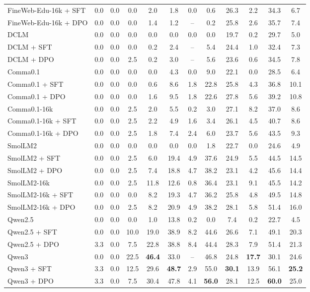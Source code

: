 \begin{table}[ht]
\begin{tabular}{lccccccccccc}
FineWeb-Edu-16k + SFT & 0.0 & 0.0 & 0.0 & 2.0 & 1.8 & 0.0 & 0.6 & 26.3 & 2.2 & 34.3 & 6.7 \\
FineWeb-Edu-16k + DPO & 0.0 & 0.0 & 0.0 & 1.4 & 1.2 & -- & 0.2 & 25.8 & 2.6 & 35.7 & 7.4 \\
\midrule
\addlinespace[0.3em]
DCLM & 0.0 & 0.0 & 0.0 & 0.0 & 0.0 & 0.0 & 0.0 & 19.7 & 0.2 & 29.7 & 5.0 \\
DCLM + SFT & 0.0 & 0.0 & 0.0 & 0.2 & 2.4 & -- & 5.4 & 24.4 & 1.0 & 32.4 & 7.3 \\
DCLM + DPO & 0.0 & 0.0 & 2.5 & 0.2 & 3.0 & -- & 5.6 & 23.6 & 0.6 & 34.5 & 7.8 \\
\midrule
\addlinespace[0.3em]
Comma0.1 & 0.0 & 0.0 & 0.0 & 0.0 & 4.3 & 0.0 & 9.0 & 22.1 & 0.0 & 28.5 & 6.4 \\
Comma0.1 + SFT & 0.0 & 0.0 & 0.0 & 0.6 & 8.6 & 1.8 & 22.8 & 25.8 & 4.3 & 36.8 & 10.1 \\
Comma0.1 + DPO & 0.0 & 0.0 & 0.0 & 1.6 & 9.5 & 1.8 & 22.6 & 27.8 & 5.6 & 39.2 & 10.8 \\
\midrule
\addlinespace[0.3em]
Comma0.1-16k & 0.0 & 0.0 & 2.5 & 2.0 & 5.5 & 0.2 & 3.0 & 27.1 & 8.2 & 37.0 & 8.6 \\
Comma0.1-16k + SFT & 0.0 & 0.0 & 2.5 & 2.2 & 4.9 & 1.6 & 3.4 & 26.1 & 4.5 & 40.7 & 8.6 \\
Comma0.1-16k + DPO & 0.0 & 0.0 & 2.5 & 1.8 & 7.4 & 2.4 & 6.0 & 23.7 & 5.6 & 43.5 & 9.3 \\
\midrule
\addlinespace[0.3em]
SmolLM2 & 0.0 & 0.0 & 0.0 & 0.0 & 0.0 & 0.0 & 1.8 & 22.7 & 0.0 & 24.6 & 4.9 \\
SmolLM2 + SFT & 0.0 & 0.0 & 2.5 & 6.0 & 19.4 & 4.9 & 37.6 & 24.9 & 5.5 & 44.5 & 14.5 \\
SmolLM2 + DPO & 0.0 & 0.0 & 2.5 & 7.4 & 18.8 & 4.7 & 38.2 & 23.1 & 4.2 & 45.6 & 14.4 \\
\midrule
\addlinespace[0.3em]
SmolLM2-16k & 0.0 & 0.0 & 2.5 & 11.8 & 12.6 & 0.8 & 36.4 & 23.1 & 9.1 & 45.5 & 14.2 \\
SmolLM2-16k + SFT & 0.0 & 0.0 & 0.0 & 8.2 & 19.3 & 4.7 & 36.2 & 25.8 & 4.8 & 49.5 & 14.8 \\
SmolLM2-16k + DPO & 0.0 & 0.0 & 2.5 & 8.2 & 20.9 & 4.9 & 38.2 & 28.1 & 5.8 & 51.4 & 16.0 \\
\midrule
\addlinespace[0.3em]
Qwen2.5 & 0.0 & 0.0 & 0.0 & 1.0 & 13.8 & 0.2 & 0.0 & 7.4 & 0.2 & 22.7 & 4.5 \\
Qwen2.5 + SFT & 0.0 & 0.0 & 10.0 & 19.0 & 38.9 & 8.2 & 44.6 & 26.6 & 7.1 & 49.1 & 20.3 \\
Qwen2.5 + DPO & 3.3 & 0.0 & 7.5 & 22.8 & 38.8 & 8.4 & 44.4 & 28.3 & 7.9 & 51.4 & 21.3 \\
\midrule
\addlinespace[0.3em]
Qwen3 & 0.0 & 0.0 & 22.5 & \textbf{46.4} & 33.0 & -- & 46.8 & 24.8 & \textbf{17.7} & 30.1 & 24.6 \\
Qwen3 + SFT & 3.3 & 0.0 & 12.5 & 29.6 & \textbf{48.7} & 2.9 & 55.0 & \textbf{30.1} & 13.9 & 56.1 & \textbf{25.2} \\
Qwen3 + DPO & 3.3 & 0.0 & 7.5 & 30.4 & 47.8 & 4.1 & \textbf{56.0} & 28.1 & 12.5 & \textbf{60.0} & 25.0 \\
\bottomrule
\end{tabular}
\end{table}


